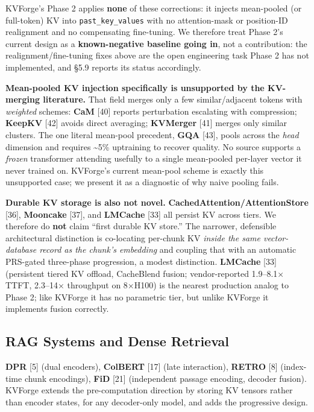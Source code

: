 KVForge's Phase 2 applies \textbf{none} of these corrections: it injects mean-pooled (or full-token) KV into \texttt{past\_key\_values} with no attention-mask or position-ID realignment and no compensating fine-tuning. We therefore treat Phase 2's current design as a \textbf{known-negative baseline going in}, not a contribution: the realignment/fine-tuning fixes above are the open engineering task Phase 2 has not implemented, and §5.9 reports its status accordingly.

\textbf{Mean-pooled KV injection specifically is unsupported by the KV-merging literature.} That field merges only a few similar/adjacent tokens with \emph{weighted} schemes: \textbf{CaM} {[}40{]} reports perturbation escalating with compression; \textbf{KeepKV} {[}42{]} avoids direct averaging; \textbf{KVMerger} {[}41{]} merges only similar clusters. The one literal mean-pool precedent, \textbf{GQA} {[}43{]}, pools across the \emph{head} dimension and requires \textasciitilde5\% uptraining to recover quality. No source supports a \emph{frozen} transformer attending usefully to a single mean-pooled per-layer vector it never trained on. KVForge's current mean-pool scheme is exactly this unsupported case; we present it as a diagnostic of why naive pooling fails.

\textbf{Durable KV storage is also not novel.} \textbf{CachedAttention/AttentionStore} {[}36{]}, \textbf{Mooncake} {[}37{]}, and \textbf{LMCache} {[}33{]} all persist KV across tiers. We therefore do \textbf{not} claim ``first durable KV store.'' The narrower, defensible architectural distinction is co-locating per-chunk KV \emph{inside the same vector-database record as the chunk's embedding} and coupling that with an automatic PRS-gated three-phase progression, a modest distinction. \textbf{LMCache} {[}33{]} (persistent tiered KV offload, CacheBlend fusion; vendor-reported 1.9--8.1× TTFT, 2.3--14× throughput on 8×H100) is the nearest production analog to Phase 2; like KVForge it has no parametric tier, but unlike KVForge it implements fusion correctly.

\hypertarget{rag-systems-and-dense-retrieval}{%
\subsection{RAG Systems and Dense Retrieval}\label{rag-systems-and-dense-retrieval}}

\textbf{DPR} {[}5{]} (dual encoders), \textbf{ColBERT} {[}17{]} (late interaction), \textbf{RETRO} {[}8{]} (index-time chunk encodings), \textbf{FiD} {[}21{]} (independent passage encoding, decoder fusion). KVForge extends the pre-computation direction by storing KV tensors rather than encoder states, for any decoder-only model, and adds the progressive design.

